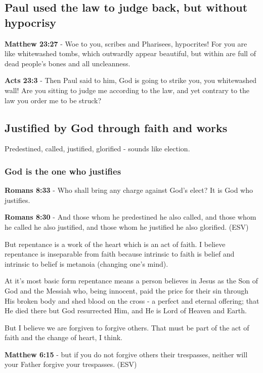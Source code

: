 \documentclass[11pt]{article}
\begin{document}
\subsection{Paul used the law to judge back, but without hypocrisy}
\label{sec:orgd3722e8}
\textbf{Matthew 23:27} - Woe to you, scribes and Pharisees, hypocrites! For you are like whitewashed tombs, which outwardly appear beautiful, but within are full of dead people's bones and all uncleanness.

\textbf{Acts 23:3} - Then Paul said to him, God is going to strike you, you whitewashed wall! Are you sitting to judge me according to the law, and yet contrary to the law you order me to be struck?

\subsection{Justified by God through faith and works}
\label{sec:orgd2ee264}
Predestined, called, justified, glorified - sounds like election.
\subsubsection{God is the one who justifies}
\label{sec:org8a05751}

\textbf{Romans 8:33} - Who shall bring any charge against God's elect? It is God who justifies.

\textbf{Romans 8:30} - And those whom he predestined he also called, and those whom he called he also justified, and those whom he justified he also glorified. (ESV)

But repentance is a work of the heart which is an act of faith.
I believe repentance is inseparable from faith because intrinsic to faith is belief and intrinsic to belief is metanoia (changing one's mind).

At it's most basic form repentance means a person believes in Jesus as the Son of God and the Messiah who, being innocent, paid the price for their sin through His broken body and shed blood on the cross - a perfect and eternal offering; that He died there but God resurrected Him, and He is Lord of Heaven and Earth.

But I believe we are forgiven to forgive others. That must be part of the act of faith and the change of heart, I think.

\textbf{Matthew 6:15} - but if you do not forgive others their trespasses, neither will your Father forgive your trespasses. (ESV)
\end{document}
